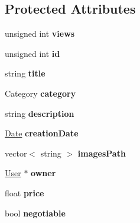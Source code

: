 \subsection*{Protected Attributes}
\begin{DoxyCompactItemize}
\item 
\hypertarget{class_advertisement_afa7bb3d8371e8fdc476614f472f31ec9}{}unsigned int {\bfseries views}\label{class_advertisement_afa7bb3d8371e8fdc476614f472f31ec9}

\item 
\hypertarget{class_advertisement_a0cb0d85726a8f955d2ab8bb312814e88}{}unsigned int {\bfseries id}\label{class_advertisement_a0cb0d85726a8f955d2ab8bb312814e88}

\item 
\hypertarget{class_advertisement_a63b197da6f91139ed6baf700f834a3db}{}string {\bfseries title}\label{class_advertisement_a63b197da6f91139ed6baf700f834a3db}

\item 
\hypertarget{class_advertisement_af77599e289974c0e4f502db621257fe5}{}Category {\bfseries category}\label{class_advertisement_af77599e289974c0e4f502db621257fe5}

\item 
\hypertarget{class_advertisement_afb0909f9fceabb44804e06e721ff7fee}{}string {\bfseries description}\label{class_advertisement_afb0909f9fceabb44804e06e721ff7fee}

\item 
\hypertarget{class_advertisement_a1997017950120c6ed305d772baae32b2}{}\hyperlink{class_date}{Date} {\bfseries creation\+Date}\label{class_advertisement_a1997017950120c6ed305d772baae32b2}

\item 
\hypertarget{class_advertisement_a72772fb9304654e877b5dd9b3b5b4f6e}{}vector$<$ string $>$ {\bfseries images\+Path}\label{class_advertisement_a72772fb9304654e877b5dd9b3b5b4f6e}

\item 
\hypertarget{class_advertisement_a10398131c5aadcd1fdf08d6acabec45f}{}\hyperlink{class_user}{User} $\ast$ {\bfseries owner}\label{class_advertisement_a10398131c5aadcd1fdf08d6acabec45f}

\item 
\hypertarget{class_advertisement_aefd1dddaabd0cfa411e6cbaaf67c4dd5}{}float {\bfseries price}\label{class_advertisement_aefd1dddaabd0cfa411e6cbaaf67c4dd5}

\item 
\hypertarget{class_advertisement_a34021160ad144fefd9df9a30d19bd895}{}bool {\bfseries negotiable}\label{class_advertisement_a34021160ad144fefd9df9a30d19bd895}

\end{DoxyCompactItemize}
